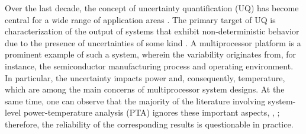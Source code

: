 Over the last decade, the concept of uncertainty quantification (UQ) has become central for a wide range of application areas \cite{xiu2010}. The primary target of UQ is characterization of the output of systems that exhibit non-deterministic behavior due to the presence of uncertainties of some kind \cite{eldred2009}. A multiprocessor platform is a prominent example of such a system, wherein the variability originates from, for instance, the semiconductor manufacturing process and operating environment. In particular, the uncertainty impacts power and, consequently, temperature, which are among the main concerns of multiprocessor system designs. At the same time, one can observe that the majority of the literature involving system-level power-temperature analysis (PTA) ignores these important aspects, \eg, \cite{rao2009, rai2011, thiele2011, ukhov2012}; therefore, the reliability of the corresponding results is questionable in practice.

